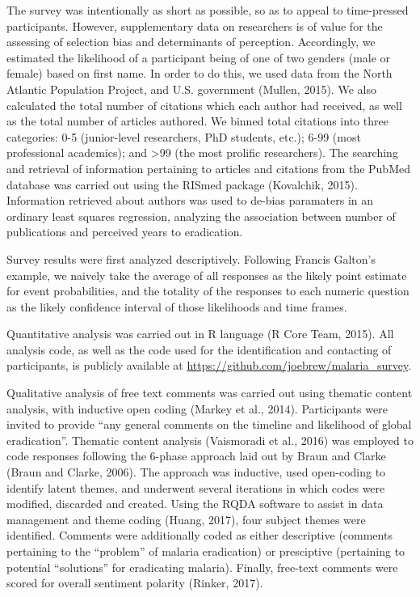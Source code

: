 \documentclass[]{article}
\begin{document}
The survey was intentionally as short as possible, so as to appeal to
time-pressed participants. However, supplementary data on researchers is
of value for the assessing of selection bias and determinants of
perception. Accordingly, we estimated the likelihood of a participant
being of one of two genders (male or female) based on first name. In
order to do this, we used data from the North Atlantic Population
Project, and U.S. government (Mullen, 2015). We also calculated the
total number of citations which each author had received, as well as the
total number of articles authored. We binned total citations into three
categories: 0-5 (junior-level researchers, PhD students, etc.); 6-99
(most professional academics); and \textgreater{}99 (the most prolific
researchers). The searching and retrieval of information pertaining to
articles and citations from the PubMed database was carried out using
the RISmed package (Kovalchik, 2015). Information retrieved about
authors was used to de-bias paramaters in an ordinary least squares
regression, analyzing the association between number of publications and
perceived years to eradication.

Survey results were first analyzed descriptively. Following Francis
Galton's example, we naively take the average of all responses as the
likely point estimate for event probabilities, and the totality of the
responses to each numeric question as the likely confidence interval of
those likelihoods and time frames.

Quantitative analysis was carried out in R language (R Core Team, 2015).
All analysis code, as well as the code used for the identification and
contacting of participants, is publicly available at
\url{https://github.com/joebrew/malaria_survey}.

Qualitative analysis of free text comments was carried out using
thematic content analysis, with inductive open coding (Markey et al.,
2014). Participants were invited to provide ``any general comments on
the timeline and likelihood of global eradication''. Thematic content
analysis (Vaismoradi et al., 2016) was employed to code responses
following the 6-phase approach laid out by Braun and Clarke (Braun and
Clarke, 2006). The approach was inductive, used open-coding to identify
latent themes, and underwent several iterations in which codes were
modified, discarded and created. Using the RQDA software to assist in
data management and theme coding (Huang, 2017), four subject themes were
identified. Comments were additionally coded as either descriptive
(comments pertaining to the ``problem'' of malaria eradication) or
presciptive (pertaining to potential ``solutions'' for eradicating
malaria). Finally, free-text comments were scored for overall sentiment
polarity (Rinker, 2017).
\end{document}
